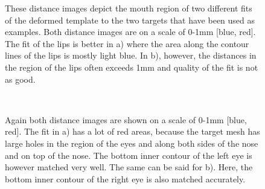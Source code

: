 \begin{figure}[h!]
    \centering
    \quad
    \label{fig:distmaplips}
    \caption{These distance images depict the mouth region of two different fits of the deformed template to the two targets that have been used as examples. Both distance images are on a scale of 0-1mm [blue, red]. The fit of the lips is better in a) where the area along the contour lines of the lips is mostly light blue. In b), however, the distances in the region of the lips often exceeds 1mm and quality of the fit is not as good.}
\end{figure}

\begin{figure}[h!]
    \centering
    \\
    \label{fig:distmapeyes}
    \caption{Again both distance images are shown on a scale of 0-1mm [blue, red]. The fit in a) has a lot of red areas, because the target mesh has large holes in the region of the eyes and along both sides of the nose and on top of the nose. The bottom inner contour of the left eye is however matched very well. The same can be said for b). Here, the bottom inner contour of the right eye is also matched accurately.}
\end{figure}

